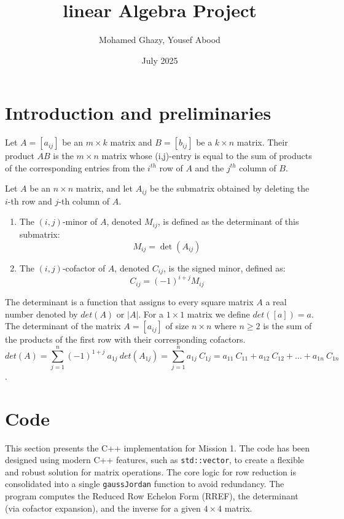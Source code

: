 \documentclass{article}
\title{linear Algebra Project}
\author{Mohamed Ghazy, Yousef Abood}
\date{July 2025}
\begin{document}
\maketitle

\section{Introduction and preliminaries}
{
Let $A=[a_{ij}]$ be an $m \times k$ matrix and $B=[b_{ij}]$ be a $k \times n$ matrix. Their product $AB$ is the $m \times n$ matrix whose (i,j)-entry is equal to the sum of products of the corresponding entries from the $i^{th}$ row of $A$ and the $j^{th}$ column of $B.$
}

{
Let $A$ be an $n \times n$ matrix, and let $A_{ij}$ be the submatrix obtained by deleting the $i$-th row and $j$-th column of $A$.

\begin{enumerate}
    \item The {$(i,j)$-minor} of $A$, denoted $M_{ij}$, is defined as the determinant of this submatrix:
    \[
        M_{ij} = \det(A_{ij})
    \]

    \item The {$(i,j)$-cofactor} of $A$, denoted $C_{ij}$, is the signed minor, defined as:
    \[
        C_{ij} = (-1)^{i+j} M_{ij}
    \]
\end{enumerate}
}


{
The determinant is a function that assigns to every square matrix $A$ a real number denoted by $det(A)$ or $|A|$. For a $1 \times 1$ matrix we define $det([a])=a.$ The determinant of the matrix $A=[a_{ij}]$ of size $n \times n$ where $n \geq 2$ is the sum of the products of the first row with their corresponding cofactors.
\[det(A)=\sum_{j=1}^{n} (-1)^{1+j}\ a_{1j} \ det(A_{1j})=\sum_{j=1}^{n} a_{1j}\ C_{1j}= a_{11}\ C_{11}+ a_{12}\ C_{12}+\dots + a_{1n}\ C_{1n}\].
}

\section{Code}

This section presents the C++ implementation for Mission 1. The code has been designed using modern C++ features, such as \texttt{std::vector}, to create a flexible and robust solution for matrix operations. The core logic for row reduction is consolidated into a single \texttt{gaussJordan} function to avoid redundancy. The program computes the Reduced Row Echelon Form (RREF), the determinant (via cofactor expansion), and the inverse for a given $4 \times 4$ matrix.
\end{document}
